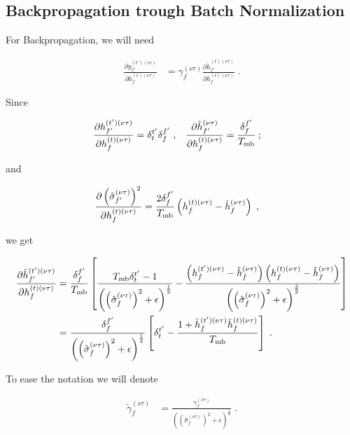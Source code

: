 \begin{subappendices}


\section{Backpropagation trough Batch Normalization}

For Backpropagation, we will need

\begin{align}
\frac{\partial y^{(t')(\nu\tau)}_{f'}}{\partial h_{f}^{(t)(\nu\tau)}}&=
%
\gamma^{(\nu\tau)}_f\frac{\partial \tilde{h}_{f'}^{(t)(\nu\tau)}}{\partial h_{f}^{(t)(\nu\tau)}}\;.
\end{align}

Since

\begin{align}
\frac{\partial h^{(t')(\nu\tau)}_{f'}}{\partial h_{f}^{(t)(\nu\tau)}}&=\delta^{t'}_t\delta^{f'}_f\;,&
%
\frac{\partial \hat{h}_{f'}^{(\nu\tau)}}{\partial h_{f}^{(t)(\nu\tau)}}&=\frac{\delta^{f'}_f}{T_{{\rm mb}}}\:;
\end{align}

and

\begin{align}
\frac{\partial \left(\hat{\sigma}_{f'}^{(\nu\tau)}\right)^2}{\partial h_{f}^{(t)(\nu\tau)}}&=
%
\frac{2\delta^{f'}_f}{T_{{\rm mb}}}\left(h_{f}^{(t)(\nu\tau)}-\hat{h}_{f}^{(\nu\tau)}\right)\;,
\end{align}

we get

\begin{align}
\frac{\partial \tilde{h}_{f'}^{(t')(\nu\tau)}}{\partial h_{f}^{(t)(\nu\tau)}}&=
%
\frac{\delta^{f'}_f}{T_{{\rm mb}}}\left[\frac{T_{{\rm mb}}\delta^{t'}_t-1}
%
{\left(\left(\hat{\sigma}_{f}^{(\nu\tau)}\right)^2+\epsilon\right)^\frac12}-
%
\frac{\left(h_{f}^{(t')(\nu\tau)}-\hat{h}_{f}^{(\nu\tau)}\right)\left(h_{f}^{(t)(\nu\tau)}-\hat{h}_{f}^{(\nu\tau)}\right)}
%
{\left(\left(\hat{\sigma}_{f}^{(\nu\tau)}\right)^2+\epsilon\right)^\frac32}\right]\notag\\
%
&=\frac{\delta^{f'}_f}{\left(\left(\hat{\sigma}_{f}^{(\nu\tau)}\right)^2+\epsilon\right)^\frac12}
%
\left[\delta^{t'}_t-
%
\frac{1+\tilde{h}_{f}^{(t')(\nu\tau)}\tilde{h}_{f}^{(t)(\nu\tau)}}{T_{{\rm mb}}}\right]\;.
\end{align}

To ease the notation we will denote

\begin{align}
\tilde{\gamma}^{(\nu\tau)}_f&=
%
\frac{\gamma^{(\nu\tau)}_f}{\left(\left(\hat{\sigma}_{f}^{(\nu\tau)}\right)^2+\epsilon\right)^\frac12}\;.
\end{align}


\end{subappendices}
